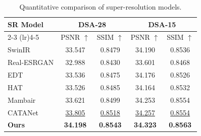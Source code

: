 \documentclass[runningheads]{llncs}
\begin{document}
\begin{table}[t]
\centering
\caption{Quantitative comparison of super-resolution models.}
\label{tab:sr_model_comparison}
\setlength{\tabcolsep}{10pt}    %
\small
\begin{tabular}{l|cc|cc}
\toprule
\multirow{2}{*}{SR Model} & \multicolumn{2}{c|}{DSA-28} & \multicolumn{2}{c}{DSA-15} \\
\cmidrule(lr){2-3} \cmidrule(lr){4-5}
 & PSNR $\uparrow$ & SSIM $\uparrow$ & PSNR $\uparrow$ & SSIM $\uparrow$ \\
\midrule
SwinIR\cite{liang2021swinir} & 33.547 & 0.8479 & 34.190 & 0.8536 \\
Real-ESRGAN\cite{wang2021realesrgan} & 32.988 & 0.8430 & 33.601 & 0.8468 \\
EDT\cite{li2021efficient} & 33.536 & 0.8475 & 34.176 & 0.8526 \\
HAT\cite{chen2023hat} & 33.526 & 0.8485 & 34.164 & 0.8532 \\
Mambair\cite{guo2025mambairv2} & 33.621 & 0.8499 & 34.253 & 0.8554 \\
CATANet\cite{liu2025catanet} & \underline{33.805} & \underline{0.8518} & \underline{34.257} & \underline{0.8554} \\
\textbf{Ours} & \textbf{34.198} & \textbf{0.8543} & \textbf{34.323} & \textbf{0.8563} \\
\bottomrule
\end{tabular}
\end{table}



\end{document}
